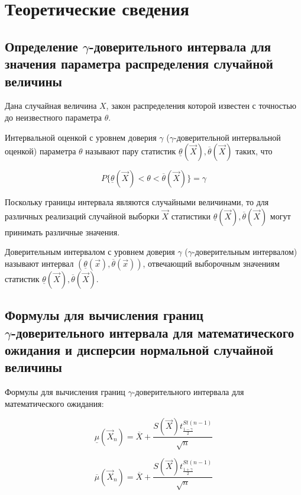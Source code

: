 \documentclass[12pt]{report}
\begin{document}
\chapter*{Теоретические сведения}

\section*{Определение $\gamma$-доверительного интервала для значения параметра распределения случайной величины}

Дана случайная величина $X$, закон распределения которой известен с точностью до неизвестного параметра $\theta$.

Интервальной оценкой с уровнем доверия $\gamma$ ($\gamma$-доверительной интервальной оценкой) параметра $\theta$ называют пару статистик $\underline{\theta}(\vec X), \overline{\theta}(\vec X)$ таких, что

\begin{equation*}
	P\{\underline{\theta}(\vec X)<\theta<\overline{\theta}(\vec X)\}=\gamma
\end{equation*}

Поскольку границы интервала являются случайными величинами, то для различных реализаций случайной выборки $\vec X$ статистики $\underline{\theta}(\vec X), \overline{\theta}(\vec X)$ могут принимать различные значения.

Доверительным интервалом с уровнем доверия $\gamma$ ($\gamma$-доверительным интервалом) называют интервал $(\underline{\theta}(\vec x), \overline{\theta}(\vec x))$, отвечающий выборочным значениям статистик $\underline{\theta}(\vec X), \overline{\theta}(\vec X)$.

\section*{Формулы для вычисления границ \\ $\gamma$-доверительного интервала для математического ожидания и дисперсии нормальной случайной величины}

Формулы для вычисления границ $\gamma$-доверительного интервала для математического ожидания:

\begin{equation}
\underline\mu(\vec X_n)=\overline X + \frac{S(\vec X)t^{St(n-1)}_{\frac{1-\gamma}{2}}}{\sqrt{n}}
\end{equation}

\begin{equation}
\overline\mu(\vec X_n)=\overline X + \frac{S(\vec X)t^{St(n-1)}_{\frac{1+\gamma}{2}}}{\sqrt{n}}
\end{equation}
\end{document}
